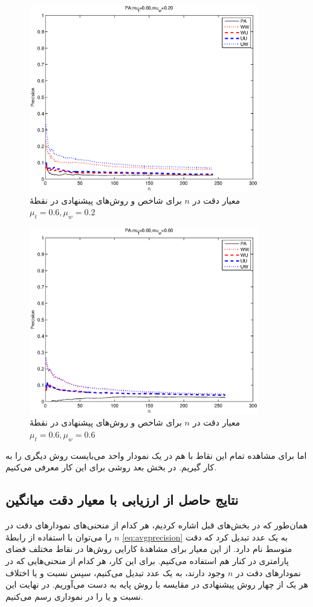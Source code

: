 \begin{figure}[!htb]
  \begin{center}
    \includegraphics[width=10cm]{PAmut06muw02.eps}
    \caption{معیار دقت در $n$ برای شاخص  و روش‌های پیشنهادی در نقطهٔ $\mu_t=0.6,\mu_w=0.2$}
    \label{fig:PAmut06muw02}
  \end{center}
\end{figure}
\begin{figure}[!htb]
  \begin{center}
    \includegraphics[width=10cm]{PAmut06muw06.eps}
    \caption{معیار دقت در $n$ برای شاخص  و روش‌های پیشنهادی در نقطهٔ $\mu_t=0.6,\mu_w=0.6$}
    \label{fig:PAmut06muw06}
  \end{center}
\end{figure}

اما برای مشاهده تمام این نقاط با هم در یک نمودار واحد می‌بایست روش دیگری را به کار گیریم. در بخش بعد روشی برای این کار معرفی می‌کنیم.

\subsection{نتایج حاصل از ارزیابی با معیار دقت میانگین}
همان‌طور که در بخش‌های قبل اشاره کردیم، هر کدام از منحنی‌های نمودارهای دقت در $n$ را می‌توان با استفاده از رابطهٔ \ref{eq:avgprecision} به یک عدد تبدیل کرد که دقت متوسط نام دارد. از این معیار برای مشاهدهٔ کارایی روش‌ها در نقاط مختلف فضای پارامتری در کنار هم استفاده می‌کنیم. برای این کار، هر کدام از منحنی‌هایی که در نمودارهای دقت در $n$ وجود دارند، به یک عدد تبدیل می‌کنیم، سپس نسبت و یا اختلاف هر یک از چهار روش پیشنهادی در مقایسه با روش پایه به دست می‌آوریم. در نهایت این نسبت و یا را در نموداری رسم می‌کنیم.

